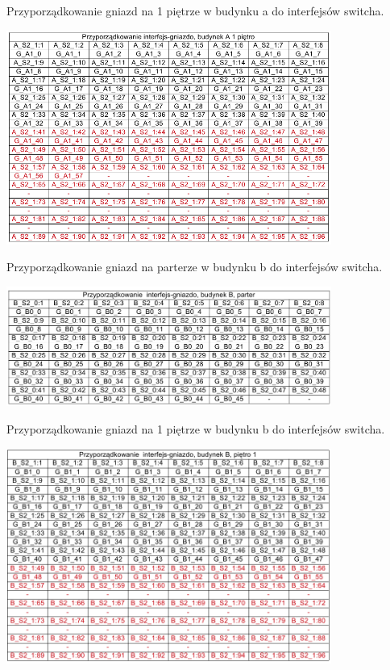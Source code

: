 \documentclass{report}
\begin{document}
\begin{table}[H]
\caption{Przyporządkowanie gniazd na 1 piętrze w budynku a do interfejsów switcha.}
 \centering
      \includegraphics[width=0.8\textwidth]{./obrazki/tab_kros/a1.png}
\end{table}

\begin{table}[H]
\caption{Przyporządkowanie gniazd na parterze w budynku b do interfejsów switcha.}
 \centering
      \includegraphics[width=0.8\textwidth]{./obrazki/tab_kros/b0.png}
\end{table}

\begin{table}[H]
\caption{Przyporządkowanie gniazd na 1 piętrze w budynku b do interfejsów switcha.}
 \centering
      \includegraphics[width=0.8\textwidth]{./obrazki/tab_kros/b1.png}
\end{table}
\end{document}
